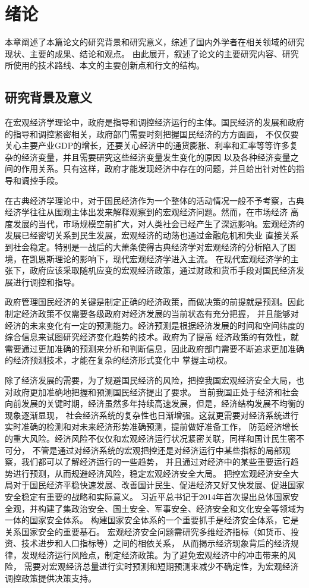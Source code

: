 \section{绪论}
本章阐述了本篇论文的研究背景和研究意义，综述了国内外学者在相关领域的研究现状、主要的成果、结论和观点。
由此展开，叙述了论文的主要研究内容、研究所使用的技术路线、本文的主要创新点和行文的结构。

\subsection{研究背景及意义}
在宏观经济学理论中，政府是指导和调控经济运行的主体。国民经济的发展和政府的指导和调控紧密相关，政府部门需要时刻把握国民经济的方方面面，
不仅仅要关心主要产业GDP的增长，还要关心经济中的通货膨胀、利率和汇率等等许多复杂的经济变量，并且需要研究这些经济变量发生变化的原因
以及各种经济变量之间的作用关系。只有这样，政府才能发现经济中存在的问题，并且给出针对性的指导和调控手段。

在古典经济学理论中，对于国民经济作为一个整体的活动情况一般不予考察，古典经济学往往从围观主体出发来解释观察到的宏观经济问题。然而，在市场经济
高度发展的当代，市场规模空前扩大，对人类社会已经产生了深远影响。宏观经济的发展已经密切关系到民生发展，宏观经济的动荡也通过金融危机和失业
直接关系到社会稳定。特别是一战后的大萧条使得古典经济学对宏观经济的分析陷入了困境，在凯恩斯理论的影响下，现代宏观经济学进入主流。
在现代宏观经济学的主张下，政府应该采取随机应变的宏观经济政策，通过财政和货币手段对国民经济发展进行调控和指导。

政府管理国民经济的关键是制定正确的经济政策，而做决策的前提就是预测。因此制定经济政策不仅需要各级政府对经济发展的当前状态有充分把握，
并且能够对经济的未来变化有一定的预测能力。经济预测是根据经济发展的时间和空间纬度的综合信息来试图研究经济变化趋势的技术。政府为了提高
经济政策的有效性，就需要通过更加准确的预测来分析和判断信息，因此政府部门需要不断追求更加准确的经济预测技术，才能在复杂的经济形式变化中
掌握主动权。

除了经济发展的需要，为了规避国民经济的风险，把控我国宏观经济安全大局，也对政府更加准确地把握和预测国民经济提出了要求。
当前我国正处于经济和社会向前发展的关键时期，经济虽然多年持续高速发展，但是，经济结构发展不均衡的现象逐渐显现，
社会经济系统的复杂性也日渐增强。这就更需要对经济系统进行实时准确的检测和对未来经济形势准确预测，提前做好准备工作，
防范经济增长的重大风险。经济风险不仅仅和宏观经济运行状况紧密关联，同样和国计民生密不可分，
不管是通过对经济系统的宏观把控还是对经济运行中某些指标的局部观察，我们都可以了解经济运行的一些趋势，
并且通过对经济中的某些重要运行趋势进行预测，从而规避经济风险，稳定宏观经济安全大局。
把控宏观经济安全大局对于国民经济平稳快速发展、改善国计民生、促进经济又好又快发展、促进国家安全稳定有重要的战略和实际意义。
习近平总书记于2014年首次提出总体国家安全观，并构建了集政治安全、国土安全、军事安全、经济安全和文化安全等领域为一体的国家安全体系。
构建国家安全体系的一个重要抓手是经济安全体系，它是关系国家安全的重要基石。
宏观经济安全问题需研究多维经济指标（如货币、投资、技术进步和人口指标等）之间的相依关系，
从而揭示经济现象背后的经济规律，发现经济运行风险点，制定经济政策。为了避免宏观经济中的冲击带来的风险，
需要对宏观经济总量进行实时预测和短期预测来减少不确定性，为宏观经济调控政策提供决策支持。

